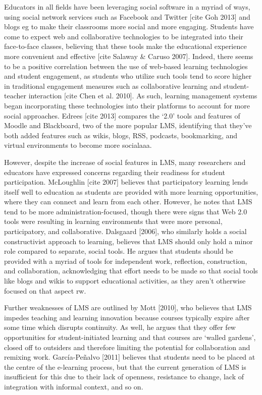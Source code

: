 Educators in all fields have been leveraging social software in a myriad of ways, using social network services such as Facebook and Twitter [cite Goh 2013] and blogs {eg} to make their classrooms more social and more engaging. Students have come to expect web and collaborative technologies to be integrated into their face-to-face classes, believing that these tools make the educational experience more convenient and effective [cite Salaway & Caruso 2007]. Indeed, there seems to be a positive correlation between the use of web-based learning technologies and student engagement, as students who utilize such tools tend to score higher in traditional engagement measures such as collaborative learning and student-teacher interaction [cite Chen et al. 2010]. As such, learning management systems began incorporating these technologies into their platforms to account for more social approaches. Edrees [cite 2013] compares the ‘2.0’ tools and features of Moodle and Blackboard, two of the more popular LMS, identifying that they’ve both added features such as wikis, blogs, RSS, podcasts, bookmarking, and virtual environments to become more socialaaa.

However, despite the increase of social features in LMS, many researchers and educators have expressed concerns regarding their readiness for student participation. McLoughlin [cite 2007] believes that participatory learning lends itself well to education as students are provided with more learning opportunities, where they can connect and learn from each other. However, he notes that LMS tend to be more administration-focused, though there were signs that Web 2.0 tools were resulting in learning environments that were more personal, participatory, and collaborative. Dalsgaard [2006], who similarly holds a social constructivist approach to learning, believes that LMS should only hold a minor role compared to separate, social tools. He argues that students should be provided with a myriad of tools for independent work, reflection, construction, and collaboration, acknowledging that effort needs to be made so that social tools like blogs and wikis to support educational activities, as they aren't otherwise focused on that aspect {rw}.

Further weaknesses of LMS are outlined by Mott [2010], who believes that LMS impedes teaching and learning innovation because courses typically expire after some time which disrupts continuity. As well, he argues that they offer few opportunities for student-initiated learning and that courses are ‘walled gardens’, closed off to outsiders and therefore limiting the potential for collaboration and remixing work. García-Peñalvo [2011] believes that students need to be placed at the centre of the e-learning process, but that the current generation of LMS is insufficient for this due to their lack of openness, resistance to change, lack of integration with informal context, and so on.

